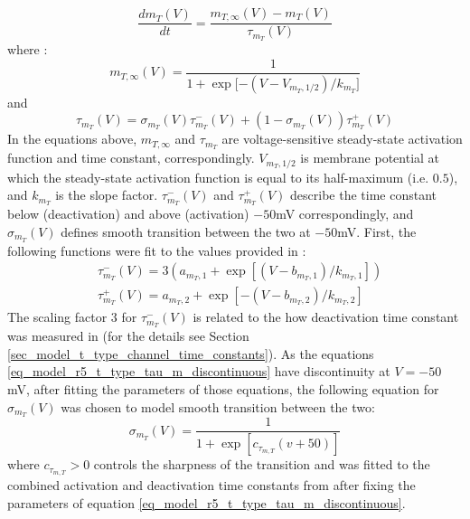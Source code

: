 \documentclass[../../workflow.tex]{subfiles}
\begin{document}
\begin{equation*}
    \frac{dm_T(V)}{dt} = \frac{m_{T,\infty}(V) - m_T(V)}{\tau_{m_T}(V)}
\end{equation*}
where \cite{coulterCalciumCurrentsRat1989,wangModelTtypeCalcium1991}:
\begin{equation}\label{eq_model_r5_t_type_steady_state_activation}
    m_{T,\infty}(V) = \frac{1}{1 + \exp{[-(V - V_{m_T,1/2})/k_{m_T}}]}
\end{equation}
and
\begin{equation}\label{eq_model_r5_t_type_tau_m}
    \tau_{m_T}(V) = \sigma_{m_T}(V) \tau_{m_T}^-(V) + (1 - \sigma_{m_T}(V))\tau_{m_T}^+(V)
\end{equation}
In the equations above, $m_{T,\infty}$ and $\tau_{m_T}$ are voltage-sensitive steady-state activation function
and time constant, correspondingly. $V_{m_T,1/2}$ is membrane potential at which the steady-state
activation function is equal to its half-maximum (i.e. $0.5$), and $k_{m_T}$ is the slope factor.
$\tau_{m_T}^-(V)$ and $\tau_{m_T}^+(V)$ describe the time constant below (deactivation) and
above (activation) $-50$mV correspondingly, and $\sigma_{m_T}(V)$ defines smooth transition between
the two at $-50$mV. First, the following functions were fit to the values provided in \cite{jeongCaa1TFlyTtype2015}:
\begin{align}\label{eq_model_r5_t_type_tau_m_discontinuous}
    & \tau_{m_T}^-(V) = 3(a_{m_T,1} + \exp{[(V - b_{m_T,1})/k_{m_T,1}]})\\
    & \tau_{m_T}^+(V) = a_{m_T,2} + \exp{[-(V - b_{m_T,2})/k_{m_T,2}]}
\end{align}
The scaling factor $3$ for $\tau_{m_T}^-(V)$ is related to the how deactivation time constant was
measured in \cite{jeongCaa1TFlyTtype2015} (for the details see Section \ref{sec_model_t_type_channel_time_constants}).
As the equations \ref{eq_model_r5_t_type_tau_m_discontinuous} have discontinuity at $V=-50$mV,
after fitting the parameters of those equations, the following equation for $\sigma_{m_T}(V)$
was chosen to model smooth transition between the two:
\begin{equation}\label{eq_model_r5_t_type_channel_tau_m_sigma}
    \sigma_{m_T}(V) = \frac{1}{1 + \exp{[ c_{\tau_{m,T}} (v + 50) ]}}
\end{equation}
where $c_{\tau_{m,T}}>0$ controls the sharpness of the transition and was fitted to the combined
activation and deactivation time constants from \cite{jeongCaa1TFlyTtype2015} after fixing the
parameters of equation \ref{eq_model_r5_t_type_tau_m_discontinuous}.
\end{document}

